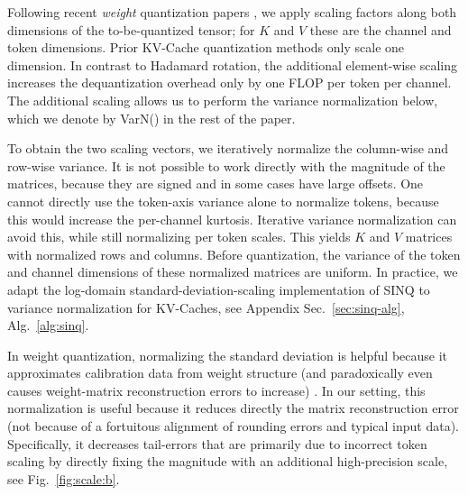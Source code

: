 \documentclass{article}
\begin{document}
Following recent \emph{weight} quantization papers \cite{muller2025sinq}, we apply scaling factors along both dimensions of the to-be-quantized tensor; for $K$ and $V$ these are the channel and token dimensions. Prior KV-Cache quantization methods only scale one dimension. In contrast to Hadamard rotation, the additional element-wise scaling increases the dequantization overhead only by one FLOP per token per channel. The additional scaling allows us to perform the variance normalization below, which we denote by VarN() in the rest of the paper. %

To obtain the two scaling vectors, we iteratively normalize the column-wise and row-wise variance.
It is not possible to work directly with the magnitude of the matrices, because they are signed and in some cases have large offsets. One cannot directly use the token-axis variance alone to normalize tokens, because this would increase the per-channel kurtosis. Iterative variance normalization can avoid this, while still normalizing per token scales. 
This yields $K$ and $V$ matrices with normalized rows and columns. Before quantization, the variance of the token and channel dimensions of these normalized matrices are uniform. In practice, we adapt the log-domain standard-deviation-scaling implementation of SINQ \cite{muller2025sinq} to variance normalization for KV-Caches, see Appendix Sec.~\ref{sec:sinq-alg}, Alg.~\ref{alg:sinq}.

 In weight quantization, normalizing the standard deviation is helpful because it approximates calibration data from weight structure (and paradoxically even causes weight-matrix reconstruction errors to increase) \cite{muller2025sinq}. In our setting, this normalization is useful because it reduces directly the matrix reconstruction error (not because of a fortuitous alignment of rounding errors and typical input data). Specifically, it decreases tail-errors that are primarily due to incorrect token scaling by directly fixing the magnitude with an additional high-precision scale, see Fig.~\ref{fig:scale:b}.
\end{document}
